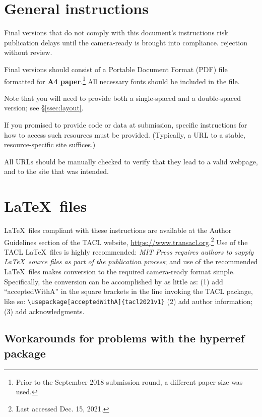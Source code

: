 \documentclass[11pt,a4paper]{article}
\newcommand{\dateOfLastUpdate}{Dec. 15, 2021}
\newcommand{\styleFileVersion}{tacl2021v1}
\newcommand{\Taclpaper}{Final version\xspace}
\newcommand{\Taclpapers}{Final versions\xspace}
\newcommand{\Taclpaper}{Submission\xspace}
\newcommand{\Taclpapers}{{\Taclpaper}s\xspace}
\begin{document}
\section{General instructions}

\Taclpapers that do not comply with this document's instructions
risk
\iftaclpubformat
publication delays until the camera-ready is brought into compliance.
\else
rejection without review.
\fi


\Taclpapers should consist of a Portable Document Format (PDF) file formatted
for  \textbf{A4 paper}.\footnote{Prior to the September 2018 submission round, a
different paper size was used.} All necessary fonts should be
included in the  file.

\iftaclpubformat
Note that you will need to provide both a single-spaced and a double-spaced
version; see \S \ref{ssec:layout}.

If you promised to provide code or data at submission, specific instructions for
how to access such resources must be provided.  (Typically, a URL to a stable,
resource-specific site suffices.)

All URLs should be manually checked to verify that they
lead to a valid webpage, and to the site that was intended.
\fi


\section{\LaTeX\ files}

\LaTeX\ files compliant with these instructions are available at the
Author Guidelines section of the
TACL website, \href{https://www.transacl.org/}
{https://www.transacl.org}.\footnote{Last accessed \dateOfLastUpdate.} Use of the
TACL \LaTeX\ files is highly recommended: \emph{MIT Press requires authors to
supply \LaTeX\ source files as part of the publication process}; and
use of the recommended \LaTeX\ files makes conversion to the
required camera-ready format simple.
\iftaclpubformat
Specifically, the conversion can be accomplished by as little as: (1) add
``acceptedWithA'' in the square brackets in the line invoking the TACL package,
like so:
{\footnotesize {\tt {\textbackslash usepackage}[acceptedWithA]\{\styleFileVersion\}}} (2) add author information;
(3) add acknowledgments.
\fi

\subsection{Workarounds for problems with the hyperref package}
\end{document}
